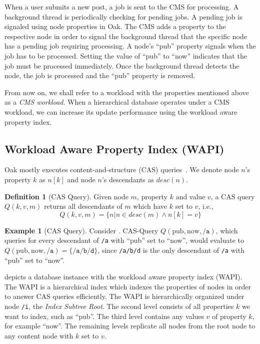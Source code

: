 \documentclass[abstracton,12pt]{scrartcl}
\theoremstyle{definition}
\newtheorem{definition}{Definition}
\newtheorem{example}{Example}
\begin{document}
When a user submits a new post, a job is sent to the CMS for processing. %
A background thread is periodically checking for pending
jobs. A pending job is signaled using node properties in Oak.
The CMS adds a property to the respective node in
order to signal the background thread that the specific node has a pending job requiring
processing. A node's ``pub'' property signals when the job has to be processed.
Setting the value of ``pub'' to ``now'' indicates that the job must be processed
immediately.
Once the background thread detects the node, the job is processed and the ``pub''
property is removed.

From now on, we shall refer to a workload with the properties mentioned above as
a \textit{CMS workload}. When a hierarchical database operates under a CMS
workload, we can increase its update performance using the workload aware
property index.

\subsection{Workload Aware Property Index (WAPI)}
\label{sec:wapi}

Oak mostly executes content-and-structure (CAS) queries~\cite{CM15}.
We denote node $n$'s property $k$ as $n[k]$ and node $n$'s descendants as
$desc(n)$.

\begin{definition}[CAS Query]
  Given node $m$, property $k$ and value $v$, a CAS query
  $Q(k,v,m)$ returns all descendants of $m$ which have $k$ set to $v$, i.e.,
  $$ Q(k,v,m) = \{ n | n \in desc(m) \land n[k] = v\} $$
  \label{def:cas-query}
\end{definition}

\begin{example}[CAS Query]
  Consider . CAS-Query $Q(\text{pub},\text{now},\texttt{/a})$,
  which queries for every descendant of \texttt{/a} with
  ``pub'' set to ``now'', would evaluate to $Q(\text{pub},\text{now},\texttt{/a}) = \{\texttt{/a/b/d}\}$,
  since \texttt{/a/b/d} is the only descendant of \texttt{/a} with ``pub'' set
  to ``now''.
  \label{ex:cas_query}
\end{example}

 depicts a database instance with the workload aware
property index (WAPI).
The WAPI is a hierarchical index which indexes the properties of nodes in order
to answer CAS queries efficiently.
The WAPI is hierarchically organized under node \texttt{/i}, the
\textit{Index Subtree Root}.
The second level consists of all properties $k$ we want
to index, such as ``pub''.
The third level contains any values $v$ of property $k$, for example
``now''.
The remaining levels replicate all nodes from the root node to any
content node with $k$ set to $v$.
\end{document}
